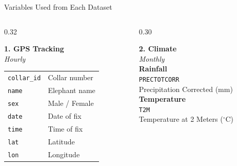 \documentclass{beamer}
\begin{document}
	\begin{frame}{Variables Used from Each Dataset}
		\vspace{0.4em}
		
		\begin{columns}[T]
			
			\begin{column}{0.32\textwidth}
				\begin{tcolorbox}[colback=lightemerald, colframe=darkgreen, boxrule=0.9pt,
					arc=2pt, left=3pt, right=3pt, top=3pt, bottom=3pt]
					{\scriptsize\textbf{\color{darkgreen}1. GPS Tracking}}\\[1pt]
					{\tiny\textit{Hourly}}\\[4pt]
					{\tiny
						\begin{tabular}{@{}ll@{}}
							\texttt{collar\_id} & Collar number \\[1.5pt]
							\texttt{name}       & Elephant name \\[1.5pt]
							\texttt{sex}        & Male / Female \\[1.5pt]
							\texttt{date}       & Date of fix \\[1.5pt]
							\texttt{time}       & Time of fix \\[1.5pt]
							\texttt{lat}        & Latitude \\[1.5pt]
							\texttt{lon}        & Longitude \\
					\end{tabular}}
				\end{tcolorbox}
			\end{column}
			
			\begin{column}{0.30\textwidth}
				\begin{tcolorbox}[colback=ashgray, colframe=softgray, boxrule=0.9pt,
					arc=2pt, left=3pt, right=3pt, top=3pt, bottom=3pt]
					{\scriptsize\textbf{\color{darkgreen}2. Climate}}\\[1pt]
					{\tiny\textit{Monthly}}\\[4pt]
					{\tiny
						\textbf{Rainfall}\\[1pt]
						\texttt{PRECTOTCORR}\\[1pt]
						Precipitation Corrected (mm)\\[6pt]
						\textbf{Temperature}\\[1pt]
						\texttt{T2M}\\[1pt]
						Temperature at 2 Meters ($^\circ$C)}
				\end{tcolorbox}
			\end{column}
			

\end{columns}
\end{frame}
\end{document}

